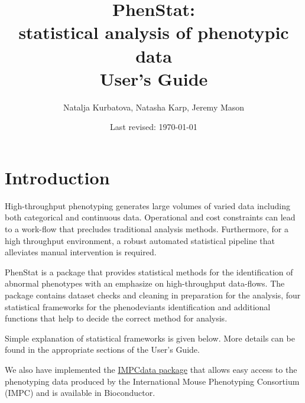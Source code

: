 \documentclass[12pt,a4paper]{article}
\title{\textbf{PhenStat}: \\ statistical analysis of phenotypic data\\ \textbf{User's Guide}}
\author{Natalja Kurbatova, Natasha Karp, Jeremy Mason}
\date{Last revised: \today}
\begin{document}
\maketitle
\newpage
\tableofcontents
\newpage
\section{Introduction}
High-throughput phenotyping generates large volumes of varied data including both categorical and continuous data. Operational and cost constraints can lead to a work-flow that precludes traditional analysis methods. Furthermore, for a high throughput environment, a robust automated statistical pipeline that alleviates manual intervention is required. 

PhenStat is a package that provides statistical methods for the identification of abnormal phenotypes with an emphasize on high-throughput data-flows. The package contains dataset checks and cleaning in preparation for the analysis, four statistical frameworks for the phenodeviants identification and additional functions that help to decide the correct method for analysis. 

Simple explanation of statistical frameworks is given below. More details can be found in the appropriate sections of the User's Guide. 

We also have implemented the \href{http://www.bioconductor.org/packages/bioc/html/IMPCdata.html}{IMPCdata package}  that allows easy access to the phenotyping data produced by the International Mouse Phenotyping Consortium (IMPC) and is available in Bioconductor.
\end{document}
